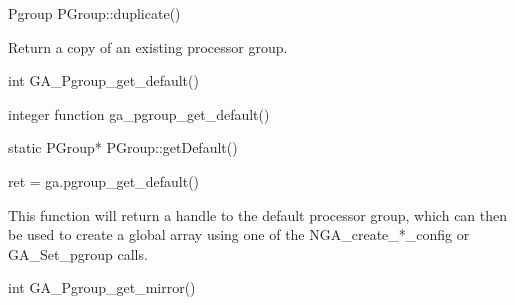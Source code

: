 \documentclass[12pt]{article}
\begin{document}
\begin{cxxapi}
\begin{cxxcode}
Pgroup PGroup::duplicate()
\end{cxxcode}
\end{cxxapi}

\begin{desc}

Return a copy of an existing processor group.

\end{desc}

\gcoll



\begin{capi}
\begin{ccode}
int GA_Pgroup_get_default()
\end{ccode}
\end{capi}

\begin{fapi}
\begin{fcode}
integer function ga_pgroup_get_default()
\end{fcode}
\end{fapi}

\begin{cxxapi}
\begin{cxxcode}
static PGroup* PGroup::getDefault()
\end{cxxcode}
\end{cxxapi}

\begin{pyapi}
\begin{pycode}
ret = ga.pgroup_get_default()
\end{pycode}
\end{pyapi}

\local

\begin{desc}
This function will return a handle to the default processor group, which can
then be used to create a global array using one of the NGA_create_*_config or
GA_Set_pgroup calls.
\end{desc}


\begin{capi}
\begin{ccode}
int GA_Pgroup_get_mirror()
\end{ccode}
\end{capi}
\end{document}
